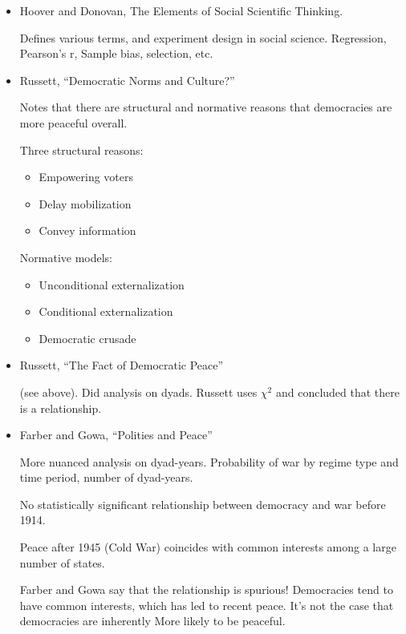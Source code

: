 \documentclass{article}
\begin{document}
\begin{itemize}
  \item Hoover and Donovan, The Elements of Social Scientific Thinking.

    Defines various terms, and experiment design in social science. Regression, Pearson's r, Sample bias, selection, etc.

    \item Russett, ``Democratic Norms and Culture?''

      Notes that there are structural and normative reasons that democracies are more peaceful overall.

      Three structural reasons:

      \begin{itemize}
        \item Empowering voters
        \item Delay mobilization
        \item Convey information
      \end{itemize}

      Normative models:
      \begin{itemize}
        \item Unconditional externalization
        \item Conditional externalization
        \item Democratic crusade
      \end{itemize}

    \item Russett, ``The Fact of Democratic Peace''

      (see above). Did analysis on dyads.  Russett uses $\chi^2$ and concluded that there is a relationship. 

    \item Farber and Gowa, ``Polities and Peace''

      More nuanced analysis on dyad-years.  Probability of war by regime type and time period, number of dyad-years.

      No statistically significant relationship between democracy and war before 1914.


      Peace after 1945 (Cold War) coincides with common interests among a large number of states.

    Farber and Gowa say that the relationship is spurious!  Democracies tend to have common interests, which has led to recent peace.  It's not the case that democracies are inherently More likely to be peaceful.


\end{itemize}
\end{document}
